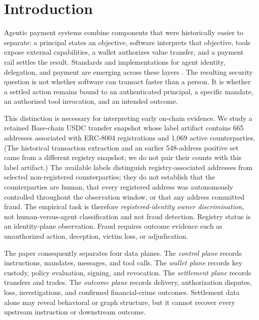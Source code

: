 
\section{Introduction}\label{sec:introduction}

Agentic payment systems combine components that were historically easier to
separate: a principal states an objective, software interprets that objective,
tools expose external capabilities, a wallet authorizes value transfer, and a
payment rail settles the result.  Standards and implementations for agent
identity, delegation, and payment are emerging across these layers
\cite{erc8004,ap2protocol2025,zhang2026sok,mao2026sok}.  The resulting security
question is not whether software can transact faster than a person.  It is
whether a settled action remains bound to an authenticated principal, a
specific mandate, an authorized tool invocation, and an intended outcome.

This distinction is necessary for interpreting early on-chain evidence.  We
study a retained Base-chain USDC transfer snapshot whose label artifact contains
665 addresses associated with ERC-8004 registrations and 1,069 active
counterparties.  (The historical transaction extraction and an earlier
548-address positive set came from a different registry snapshot; we do not
pair their counts with this label artifact.)  The available labels distinguish
registry-associated addresses from selected non-registered counterparties;
they do not establish that the counterparties are human, that every registered
address was autonomously controlled throughout the observation window, or that
any address committed fraud.  The empirical task is therefore
\emph{registered-identity owner discrimination}, not human-versus-agent
classification and not fraud detection.  Registry status is an identity-plane
observation.  Fraud requires outcome evidence such as unauthorized action,
deception, victim loss, or adjudication.

The paper consequently separates four data planes.  The \emph{control plane}
records instructions, mandates, messages, and tool calls.  The \emph{wallet
plane} records key custody, policy evaluation, signing, and revocation.  The
\emph{settlement plane} records transfers and trades.  The \emph{outcome plane}
records delivery, authorization disputes, loss, investigations, and confirmed
financial-crime outcomes.  Settlement data alone may reveal behavioral or
graph structure, but it cannot recover every upstream instruction or downstream
outcome.

